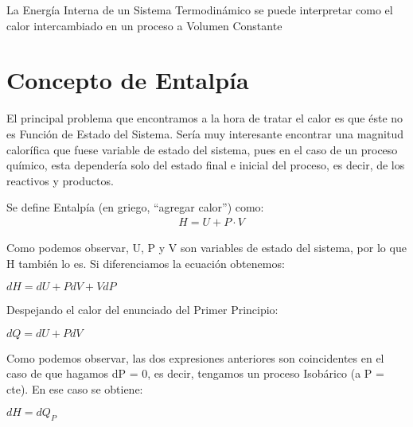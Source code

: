 \begin{definition}
	La Energía Interna de un Sistema Termodinámico se puede interpretar como el calor intercambiado en un proceso a Volumen Constante
\end{definition}

\section{Concepto de Entalpía}

El principal problema que encontramos a la hora de tratar el calor es que éste no es Función de Estado del Sistema. Sería muy interesante encontrar una magnitud calorífica que fuese variable de estado del sistema, pues en el caso de un proceso químico, esta dependería solo del estado final e inicial del proceso, es decir, de los reactivos y productos.\\
\begin{Definition}[]
	Se define Entalpía (en griego, “agregar calor”) como:
	\begin{align}
		& H = U + P\cdot V
	\end{align}
\end{Definition}

Como podemos observar, U, P y V son variables de estado del sistema, por lo que H también lo es. Si diferenciamos la ecuación obtenemos:\\

\begin{center}
	$dH = dU + PdV + VdP$\\
\end{center}

Despejando el calor del enunciado del Primer Principio:\\

\begin{center}

$dQ = dU + PdV$\\

\end{center}

Como podemos observar, las dos expresiones anteriores son coincidentes en el caso de que hagamos dP = 0, es decir, tengamos un proceso Isobárico (a P = cte). En ese caso se obtiene:\\

\begin{center}
	$dH =dQ_P$\\
\end{center}

